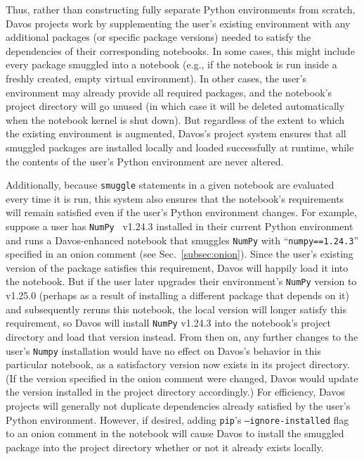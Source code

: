 \documentclass[preprint,12pt,a4paper]{elsarticle}
\begin{document}
Thus, rather than constructing fully separate Python environments from scratch, Davos projects work by supplementing the user's existing environment with any additional packages (or specific package versions) needed to satisfy the dependencies of their corresponding notebooks.
In some cases, this might include every package smuggled into a notebook (e.g., if the notebook is run inside a freshly created, empty virtual environment).
In other cases, the user's environment may already provide all required packages, and the notebook's project directory will go unused (in which case it will be deleted automatically when the notebook kernel is shut down).
But regardless of the extent to which the existing environment is augmented, Davos's project system ensures that all smuggled packages are installed locally and loaded successfully at runtime, while the contents of the user's Python environment are never altered.

Additionally, because \texttt{smuggle} statements in a given notebook are evaluated every time it is run, this system also ensures that the notebook's requirements will remain satisfied even if the user's Python environment changes.
For example, suppose a user has \texttt{NumPy}~\cite{HarrEtal20} v1.24.3 installed in their current Python environment and runs a Davos-enhanced notebook that smuggles \texttt{NumPy} with ``\texttt{numpy==1.24.3}'' specified in an onion comment (see Sec.~\ref{subsec:onion}).
Since the user's existing version of the package satisfies this requirement, Davos will happily load it into the notebook.
But if the user later upgrades their environment's \texttt{NumPy} version to v1.25.0 (perhaps as a result of installing a different package that depends on it) and subsequently reruns this notebook, the local version will longer satisfy this requirement, so Davos will install \texttt{NumPy} v1.24.3 into the notebook's project directory and load that version instead.
From then on, any further changes to the user's \texttt{Numpy} installation would have no effect on Davos's behavior in this particular notebook, as a satisfactory version now exists in its project directory.
(If the version specified in the onion comment were changed, Davos would update the version installed in the project directory accordingly.)
For efficiency, Davos projects will generally not duplicate dependencies already satisfied by the user's Python environment.
However, if desired, adding \texttt{pip}'s \texttt{--ignore-installed} flag to an onion comment in the notebook will cause Davos to install the smuggled package into the project directory whether or not it already exists locally.
\end{document}
